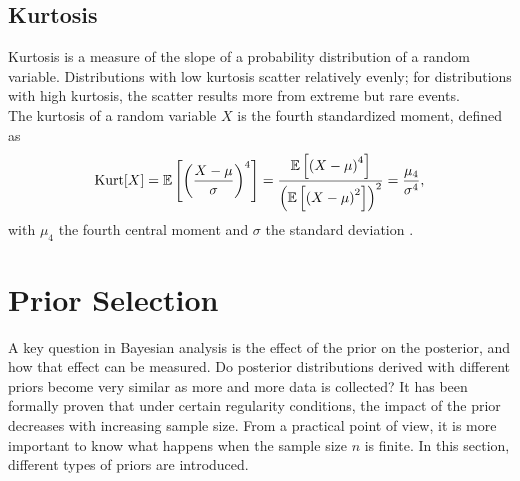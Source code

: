 \subsection{Kurtosis}
Kurtosis is a measure of the slope of a probability distribution of a random variable. Distributions with low kurtosis scatter relatively evenly; for distributions with high kurtosis, the scatter results more from extreme but rare events. \\
The kurtosis of a random variable $X$ is the fourth standardized moment, defined as
\begin{equation}\label{eq:kurtosis}
    \hbox{Kurt}[X]=\mathbb{E}\left[\left(\frac{X-\mu}{\sigma}\right)^4\right] = \frac{\mathbb{E}\left[\left(X-\mu\right)^4\right]}{\left(\mathbb{E}\left[\left(X-\mu\right)^2\right]\right)^2}=\frac{\mu_4}{\sigma^4},
\end{equation}
with $\mu_4$ the fourth central moment and $\sigma$ the standard deviation \autocite[][]{decarlo1997meaning, wilkins1944note}.
\clearpage
\section{Prior Selection}
A key question in Bayesian analysis is the effect of the prior on the posterior, and how that effect can be measured. Do posterior distributions derived with different priors become very similar as more and more data is collected? It has been formally proven that under certain regularity conditions, the impact of the prior decreases with increasing sample size. From a practical point of view, it is more important to know what happens when the sample size $n$ is finite. In this section, different types of priors are introduced.
